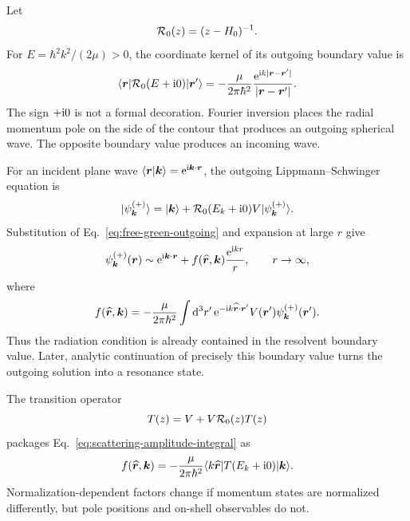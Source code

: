 Let
\begin{equation}
  \mathcal{R}_0(z)=(z-H_0)^{-1} .
  \label{eq:free-resolvent-textbook}
\end{equation}
For $E=\hbar^2k^2/(2\mu)>0$, the coordinate kernel of its outgoing boundary
value is
\begin{equation}
  \langle \bm r \rvert\mathcal{R}_0(E+\mathrm{i}0)\lvert \bm r' \rangle
  =-\frac{\mu}{2\pi\hbar^2}
  \frac{\mathrm{e}^{\mathrm{i} k\lvert\bm r-\bm r'\rvert}}
  {\lvert\bm r-\bm r'\rvert} .
  \label{eq:free-green-outgoing}
\end{equation}
The sign $+\mathrm{i}0$ is not a formal decoration.  Fourier inversion places the
radial momentum pole on the side of the contour that produces an outgoing
spherical wave.  The opposite boundary value produces an incoming wave.

For an incident plane wave $\langle \bm r\vert\bm k \rangle=\mathrm{e}^{\mathrm{i}\bm
k\cdot\bm r}$, the outgoing Lippmann--Schwinger equation is
\begin{equation}
  \lvert \psi_{\bm k}^{(+)} \rangle
  =\lvert \bm k \rangle+\mathcal{R}_0(E_k+\mathrm{i}0)V
  \lvert \psi_{\bm k}^{(+)} \rangle .
  \label{eq:ls-coordinate-foundation}
\end{equation}
Substitution of Eq.~\eqref{eq:free-green-outgoing} and expansion at large
$r$ give
\begin{equation}
  \psi_{\bm k}^{(+)}(\bm r)
  \sim \mathrm{e}^{\mathrm{i}\bm k\cdot\bm r}
  +f(\widehat{\bm r},\bm k)\frac{\mathrm{e}^{\mathrm{i} kr}}{r},
  \qquad r\to\infty,
  \label{eq:scattering-asymptotic-3d}
\end{equation}
where
\begin{equation}
  f(\widehat{\bm r},\bm k)
  =-\frac{\mu}{2\pi\hbar^2}
  \int\mathrm{d}^3r'\,
  \mathrm{e}^{-\mathrm{i} k\widehat{\bm r}\cdot\bm r'}
  V(\bm r')\psi_{\bm k}^{(+)}(\bm r') .
  \label{eq:scattering-amplitude-integral}
\end{equation}
Thus the radiation condition is already contained in the resolvent boundary
value.  Later, analytic continuation of precisely this boundary value turns
the outgoing solution into a resonance state.

The transition operator
\begin{equation}
  T(z)=V+V\mathcal{R}_0(z)T(z)
  \label{eq:T-foundation}
\end{equation}
packages Eq.~\eqref{eq:scattering-amplitude-integral} as
\begin{equation}
  f(\widehat{\bm r},\bm k)
  =-\frac{\mu}{2\pi\hbar^2}
  \langle k\widehat{\bm r} \rvert T(E_k+\mathrm{i}0)\lvert \bm k \rangle .
  \label{eq:f-T-relation}
\end{equation}
Normalization-dependent factors change if momentum states are normalized
differently, but pole positions and on-shell observables do not.

